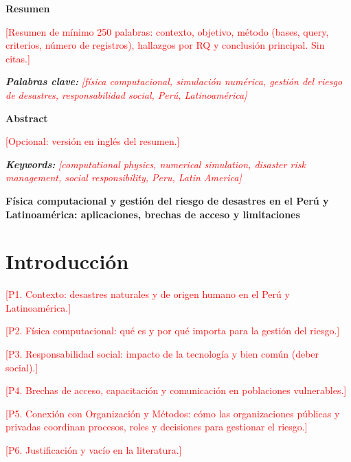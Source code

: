 \documentclass[12pt,a4paper]{article}
\newcommand{\relleno}[1]{\textcolor{red}{[#1]}}
\newcommand{\titulo}{Física computacional y gestión del riesgo de desastres en el Perú y Latinoamérica: aplicaciones, brechas de acceso y limitaciones}
\begin{document}


\newpage
\begin{center}\textbf{Resumen}\end{center}
\noindent\relleno{Resumen de mínimo 250 palabras: contexto, objetivo, método (bases, query, criterios, número de registros), hallazgos por RQ y conclusión principal. Sin citas.}

\vspace{0.5\baselineskip}
\noindent\textbf{\textit{Palabras clave:}} \textit{\relleno{física computacional, simulación numérica, gestión del riesgo de desastres, responsabilidad social, Perú, Latinoamérica}}

\vspace{1\baselineskip}
\begin{center}\textbf{Abstract}\end{center}
\noindent\relleno{Opcional: versión en inglés del resumen.}

\vspace{0.5\baselineskip}
\noindent\textbf{\textit{Keywords:}} \textit{\relleno{computational physics, numerical simulation, disaster risk management, social responsibility, Peru, Latin America}}

\newpage
\begin{center}\textbf{\titulo}\end{center}
\section{Introducción}
\relleno{P1. Contexto: desastres naturales y de origen humano en el Perú y Latinoamérica.}

\relleno{P2. Física computacional: qué es y por qué importa para la gestión del riesgo.}

\relleno{P3. Responsabilidad social: impacto de la tecnología y bien común (deber social).}

\relleno{P4. Brechas de acceso, capacitación y comunicación en poblaciones vulnerables.}

\relleno{P5. Conexión con Organización y Métodos: cómo las organizaciones públicas y privadas coordinan procesos, roles y decisiones para gestionar el riesgo.}

\relleno{P6. Justificación y vacío en la literatura.}
\end{document}
